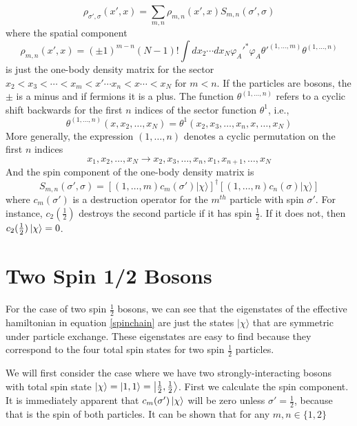 \documentclass[onecolumn,english,aps,pra]{revtex4}
\begin{document}
\begin{equation}
\rho_{\sigma', \sigma}(x', x) = \sum_{m, n} \rho_{m, n}(x', x) S_{m, n}(\sigma', \sigma)
\end{equation}
%
where the spatial component 
%
\begin{equation}
\rho_{m, n}(x', x) = (\pm 1)^{m-n} (N - 1)! \int dx_{2} \cdots dx_{N} \varphi_{A}'^* \varphi_{A} \theta'^{(1,\ldots,m)} \theta^{(1,\ldots, n)}
\end{equation}
%
is just the one-body density matrix for the sector $x_2 < x_3 < \cdots < x_m < x' \cdots x_n < x \cdots < x_N$ for $m < n$. If the particles are bosons, the $\pm$ is a minus and if fermions it is a plus. The function $\theta^{(1,\ldots, n)}$ refers to a cyclic shift backwards for the first $n$ indices of the sector function $\theta^1$, i.e., 
%
\[ \theta^{(1,\ldots, n)}(x, x_2, \ldots, x_N) = \theta^1(x_2, x_3, \ldots, x_n, x, \ldots, x_N) \]
%
More generally, the expression $(1,\ldots, n)$ denotes a cyclic permutation on the first $n$ indices
\[ x_1, x_2, \ldots, x_N \longrightarrow x_2, x_3, \ldots, x_n, x_1, x_{n+1}, \ldots, x_N \]
%
And the spin component of the one-body density matrix is
%
\begin{equation}
S_{m, n}(\sigma', \sigma) = [(1, \ldots, m) c_m(\sigma')|\chi \rangle ]^\dagger [(1, \ldots, n) c_n(\sigma)|\chi \rangle ]
\end{equation}
%
where $c_m(\sigma')$ is a destruction operator for the $m^{th}$ particle with spin $\sigma'$. For instance, $c_2(\frac{1}{2})$ destroys the second particle if it has spin $\frac{1}{2}$. If it does not, then $c_2(\frac{1}{2}) \ket{\chi} = 0$.

\section{Two Spin 1/2 Bosons}

For the case of two spin $\frac{1}{2}$ bosons, we can see that the eigenstates of the effective hamiltonian in equation \eqref{spinchain} are just the states $| \chi \rangle$ that are symmetric under particle exchange. These eigenstates are easy to find because they correspond to the four total spin states for two spin $\frac{1}{2}$ particles. 

We will first consider the case where we have two strongly-interacting bosons with total spin state $\ket{\chi} = \ket{ 1, 1 } = \ket{\frac{1}{2}, \frac{1}{2}}$. First we calculate the spin component. It is immediately apparent that $ c_m(\sigma') \ket{\chi}$ will be zero unless $\sigma' = \frac{1}{2}$, because that is the spin of both particles. It can be shown that for any $m, n \in \{ 1, 2 \}$
\end{document}
